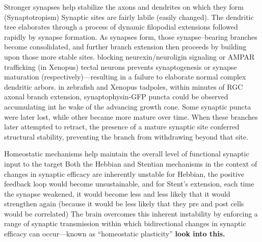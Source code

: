 \documentclass[11pt, a4paper, oneside]{article}   	%
\begin{document}
\begin{outline}
 \point Stronger synapses help stabilize the axons and dendrites on which they form (Synaptotropism)
    \subpoint Synaptic sites are fairly labile (easily changed). The dendritic tree elaborates through a process of dynamic filopodial extensions followed rapidly by synapse formation.
    \subpoint As synapses form, those synapse--bearing branches become consolidated, and further branch extension then proceeds by building upon those more stable sites.
        \subsubpoint blocking neurexin/neuroligin signaling or AMPAR trafficking (in Xenopus) tectal neurons prevents synaptogenesis or synapse maturation (respectively)---resulting in a failure to elaborate normal complex dendritic arbors.
    \subpoint in zebrafish and Xenopus tadpoles, within minutes of RGC axonal branch extension, synaptophysin-GFP puncta could be observed accumulating int he wake of the advancing growth cone. Some synaptic puncta were later lost, while other became more mature over time. When these branches later attempted to retract, the presence of a mature synaptic site conferred structural stability, preventing the branch from withdrawing beyond that site.

 \point Homeostatic mechanisms help maintain the overall level of functional synaptic input to the target
    \subpoint Both the Hebbian and Stentian mechanisms in the context of changes in synaptic efficacy are inherently unstable
        \subsubpoint for Hebbian, the positive feedback loop would become unsustainable, and for Stent's extension, each time the synapse weakened, it would become less and less likely that it would strengthen again (because it would be less likely that they pre and post cells would be correlated)
    \subpoint The brain overcomes this inherent instability by enforcing a range of synaptic transmission within which bidirectional changes in synaptic efficacy can occur---known as ``homeostatic plasticity''
    \subsubpoint \textbf{look into this.}

\end{outline}

\end{document}
